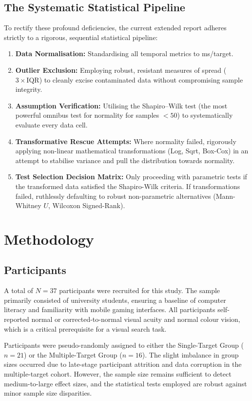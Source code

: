 \documentclass[11pt,a4paper]{article}
\begin{document}
\subsection{The Systematic Statistical Pipeline}
To rectify these profound deficiencies, the current extended report adheres strictly to a rigorous, sequential statistical pipeline:
\begin{enumerate}
    \item \textbf{Data Normalisation:} Standardising all temporal metrics to ms/target.
    \item \textbf{Outlier Exclusion:} Employing robust, resistant measures of spread ($3 \times \mathrm{IQR}$) to cleanly excise contaminated data without compromising sample integrity.
    \item \textbf{Assumption Verification:} Utilising the Shapiro--Wilk test (the most powerful omnibus test for normality for samples $< 50$) to systematically evaluate every data cell.
    \item \textbf{Transformative Rescue Attempts:} Where normality failed, rigorously applying non-linear mathematical transformations (Log, Sqrt, Box-Cox) in an attempt to stabilise variance and pull the distribution towards normality.
    \item \textbf{Test Selection Decision Matrix:} Only proceeding with parametric tests if the transformed data satisfied the Shapiro-Wilk criteria. If transformations failed, ruthlessly defaulting to robust non-parametric alternatives (Mann-Whitney $U$, Wilcoxon Signed-Rank).
\end{enumerate}

\section{Methodology}
\label{sec:methodology}

\subsection{Participants}
A total of $N=37$ participants were recruited for this study. The sample primarily consisted of university students, ensuring a baseline of computer literacy and familiarity with mobile gaming interfaces. All participants self-reported normal or corrected-to-normal visual acuity and normal colour vision, which is a critical prerequisite for a visual search task. 

Participants were pseudo-randomly assigned to either the Single-Target Group ($n=21$) or the Multiple-Target Group ($n=16$). The slight imbalance in group sizes occurred due to late-stage participant attrition and data corruption in the multiple-target cohort. However, the sample size remains sufficient to detect medium-to-large effect sizes, and the statistical tests employed are robust against minor sample size disparities.
\end{document}
